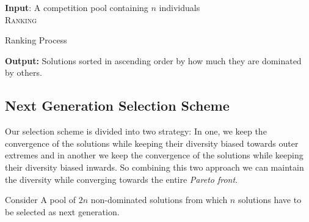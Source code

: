 \documentclass[journal]{IEEEtran}
\begin{document}
\begin{algorithm}[!h]
\textbf{Input}: A competition pool containing $n$ individuals\\
\textsc{Ranking}
\begin{algorithmic}[1]
 
\ENDFOR
{}
\end{algorithmic}
\caption{Ranking Process}
\textbf{Output:} Solutions sorted in ascending order by how much they are dominated by others.
\label{alg:rankingProcessAlgo}
\end{algorithm}


\subsection{Next Generation Selection Scheme}



Our selection scheme is divided into two strategy: In one, we keep the convergence of the solutions while keeping their diversity biased towards outer extremes and in another we keep the convergence of the solutions while keeping their diversity biased inwards. So combining this two approach we can maintain the diversity while converging towards the entire \textit{Pareto front}.

Consider A pool of $2n$ non-dominated solutions from which $n$ solutions have to be selected as next generation.
\end{document}
